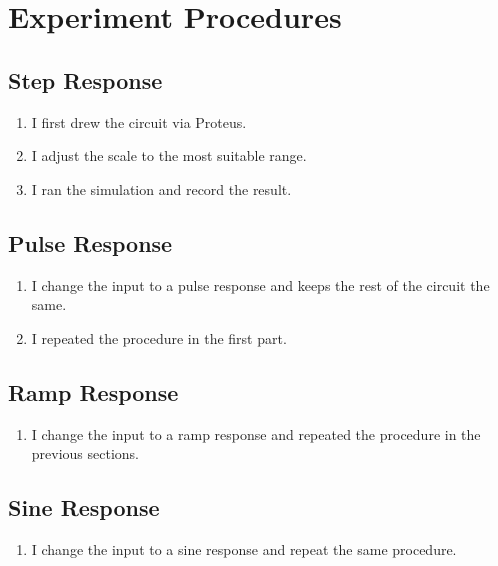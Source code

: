\documentclass [utf8] {article}
\begin{document}
\section{Experiment Procedures}{
    \subsection{Step Response}{
        \begin{enumerate}
            \item I first drew the circuit via Proteus.
            \item I adjust the scale to the most suitable range.
            \item I ran the simulation and record the result.
        \end{enumerate} 
    }
    \subsection{Pulse Response}{
        \begin{enumerate}
            \item I change the input to a pulse response and keeps the rest of the circuit the same.
            \item I repeated the procedure in the first part.
        \end{enumerate}
    }
    \subsection{Ramp Response}{
        \begin{enumerate}
            \item I change the input to a ramp response and repeated the procedure in the previous sections.
        \end{enumerate}
    }
    \subsection{Sine Response}{
        \begin{enumerate}
            \item I change the input to a sine response and repeat the same procedure.
        \end{enumerate}
    }
}
\end{document}
